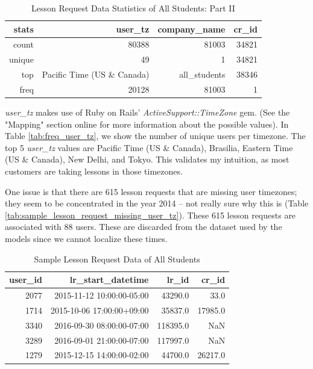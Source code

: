 \documentclass[oneside]{article}
\begin{document}
\begin{table}[]
  \centering
  \caption{Lesson Request Data Statistics of All Students: Part II}
  \label{tab:summary_stats_all_students_part_2}
  \begin{tabular}{rrrr}
    \hline
    \textbf{stats} & \textbf{user\_tz} & \textbf{company\_name} & \textbf{cr\_id} \\
    \hline
    count   &   80388    & 81003    & 34821 \\
    unique  & 49    & 1    & 34821 \\
    top    & Pacific Time (US \& Canada)   & all\_students   & 38346 \\
    freq    & 20128    & 81003    & 1 \\
    \hline
  \end{tabular}
\end{table}

\emph{user\_tz} makes use of Ruby on Rails' \emph{ActiveSupport::TimeZone}
gem\cite{astz}.  (See the "Mapping" section online for more information about
the possible values). In Table \ref{tab:freq_user_tz}, we show the number of
unique users per timezone. The top 5 \emph{user\_tz} values are Pacific Time
(US \& Canada), Brasilia, Eastern Time (US \& Canada), New Delhi, and Tokyo.
This validates my intuition, as most customers are taking lessons in those
timezones.

One issue is that there are 615 lesson requests that are missing user
timezones; they seem to be concentrated in the year 2014 -- not really sure why
this is (Table \ref{tab:sample_lesson_request_missing_user_tz}). These 615
lesson requests are associated with 88 users. These are discarded from the
dataset used by the models since we cannot localize these times.


\begin{table}[]
  \centering
  \caption{Sample Lesson Request Data of All Students}
  \label{tab:sample_lesson_request_data}
  \begin{tabular}{rrrr}
    \hline
     \textbf{user\_id} & \textbf{lr\_start\_datetime} & \textbf{lr\_id} & \textbf{cr\_id} \\
    \hline
     2077 & 2015-11-12 10:00:00-05:00 & 43290.0 & 33.0\\
     1714 & 2015-10-06 17:00:00+09:00& 35837.0& 17985.0\\
     3340 & 2016-09-30 08:00:00-07:00& 118395.0 & NaN\\
     3289 & 2016-09-01 21:00:00-07:00& 117997.0 & NaN\\
     1279 & 2015-12-15 14:00:00-02:00& 44700.0& 26217.0\\
    \hline
  \end{tabular}
\end{table}
\end{document}
